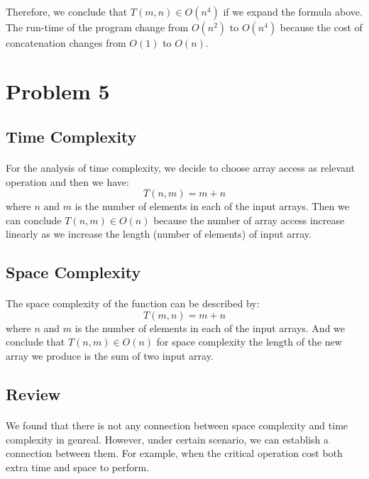 \documentclass{article}
\begin{document}
\paragraph{}
Therefore, we conclude that $ T(m,n) \in O(n^4) $ if we expand the formula above. The run-time of the program change from
$ O(n^2) $ to $ O(n^4) $ because the cost of concatenation changes from $ O(1) $ to $ O(n) $.


\section{Problem 5}

\subsection{Time Complexity}
\paragraph{}
For the analysis of time complexity, we decide to choose array access as relevant operation and then we have: 
\[ T(n,m)= m+n\]
where $ n $ and $ m $ is the number of elements in each of the input arrays.
Then we can conclude $ T(n,m) \in O(n) $ because the number of array access increase linearly as we increase the
length (number of elements) of input array.

\subsection{Space Complexity}
\paragraph{}
The space complexity of the function can be described by:
\[ T(m,n) = m + n \]
where $ n $ and $ m $ is the number of elements in each of the input arrays.
And we conclude that $ T(n,m) \in O(n) $ for space complexity the length of the new array we produce is the sum of two input array.

\subsection{Review}
\paragraph{}
We found that there is not any connection between space complexity and time complexity in genreal.
However, under certain scenario, we can establish a connection between them. For example, when the critical operation cost both extra time and space to perform.
\end{document}
